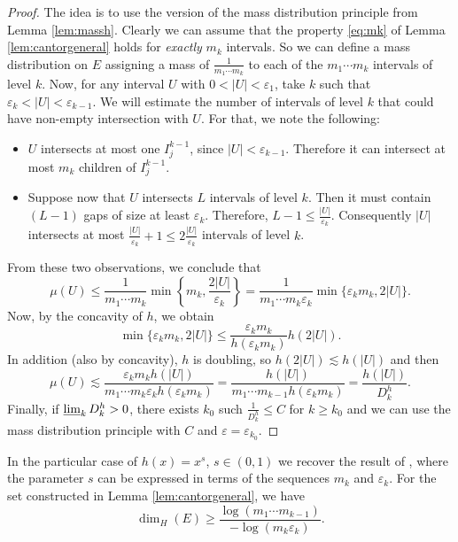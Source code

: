 \documentclass[11pt,a4paper]{amsart}
\begin{document}
\begin{proof}
The idea is to use the version of the mass distribution principle
from Lemma \ref{lem:massh}. Clearly we can assume that the
property \eqref{eq:mk} of Lemma \ref{lem:cantorgeneral} holds
for \emph{exactly} $m_k$ intervals. So we can define a mass
distribution on $E$ assigning a mass of $\frac{1}{m_1\cdots m_k}$
to each of the  $m_1\cdots m_k$ intervals of level $k$. Now, for
any interval $U$ with $0<|U|<{\varepsilon}_1$, take $k$ such that
${\varepsilon}_k<|U|<{\varepsilon}_{k-1}$. We will estimate the number of intervals of
level $k$ that could have non-empty intersection with $U$. For
that, we note the following:
\begin{itemize}
    \item $U$ intersects at most one $I^{k-1}_{j}$, since $|U|<{\varepsilon}_{k-1}$. Therefore it can intersect at most $m_k$ children of $I^{k-1}_{j}$.
    \item Suppose now that $U$ intersects $L$ intervals of level $k$. Then it must contain $(L-1)$ gaps of size at least ${\varepsilon}_k$. Therefore, $L-1\le\frac{|U|}{{\varepsilon}_k}$. Consequently $|U|$ intersects at most $\frac{|U|}{{\varepsilon}_k}+1\le 2\frac{|U|}{{\varepsilon}_k}$ intervals of level $k$.
\end{itemize}
From these two observations, we conclude that
\begin{equation*}
\mu(U)\le\frac{1}{m_1\cdots m_k}\min\left\{m_k,
\frac{2|U|}{{\varepsilon}_k}\right\}=\frac{1}{m_1\cdots
m_k{\varepsilon}_k}\min\{{\varepsilon}_km_k,2|U|\}.
\end{equation*}
Now, by the concavity of $h$, we obtain
\begin{equation*}
 \min\{{\varepsilon}_km_k,2|U|\}\le \frac{{\varepsilon}_km_k}{h({\varepsilon}_km_k)}h(2|U|).
\end{equation*}
In addition (also by concavity), $h$ is doubling, so
$h(2|U|)\lesssim h(|U|)$ and then
\begin{equation*}
\mu(U)\lesssim\frac{{\varepsilon}_km_kh(|U|)}{m_1\cdots
m_k{\varepsilon}_kh({\varepsilon}_km_k)}=\frac{h(|U|)}{m_1\cdots
m_{k-1}h({\varepsilon}_km_k)}=\frac{h(|U|)}{D^h_k}.
\end{equation*}
Finally, if $\varliminf_k D_k^h>0$, there exists $k_0$ such
$\frac{1}{D_k^h}\le C$ for $k\ge k_0$ and we can use the mass
distribution principle with $C$ and ${\varepsilon}={\varepsilon}_{k_0}$.
\end{proof}

\begin{remark}
In the particular case of $h(x)=x^s$, $s\in(0,1)$ we recover the
result of \cite{fal03}, where the parameter $s$ can be expressed
in terms of the sequences $m_k$ and ${\varepsilon}_k$. For the set
constructed in Lemma \ref{lem:cantorgeneral}, we have
\begin{equation}\label{eq:classicgeneral}
 \dim_H(E)\ge \frac{\log(m_1\cdots m_{k-1})}{-\log(m_k{\varepsilon}_k)}.
\end{equation}
\end{remark}
\end{document}
